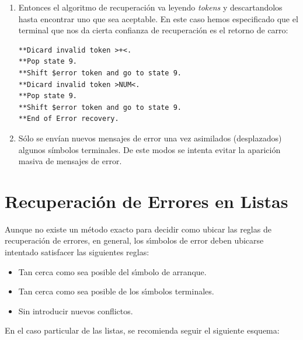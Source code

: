 \begin{enumerate}
En consecuencia, con lo dicho, en el ejemplo se va al estado 9:
\begin{verbatim}
	line -> error . '\n'	(Rule 5)
	'\n'	shift, and go to state 20
\end{verbatim}

\item
Entonces el algoritmo de recuperación va
leyendo \emph{tokens} y descartandolos hasta encontrar
uno que sea aceptable. En este caso hemos especificado
que el terminal que nos da cierta confianza de recuperación
es el retorno de carro:
\begin{verbatim}
**Dicard invalid token >+<.
**Pop state 9.
**Shift $error token and go to state 9.
**Dicard invalid token >NUM<.
**Pop state 9.
**Shift $error token and go to state 9.
**End of Error recovery.
\end{verbatim}

\item
Sólo se envían nuevos mensajes de error una vez asimilados (desplazados)
algunos símbolos terminales. De este modos se intenta evitar la aparición
masiva de mensajes de error.
\end{enumerate}

\section{Recuperación de Errores en Listas}
Aunque no existe un método exacto para decidir como ubicar
las reglas de recuperación de errores, 
en general, los s\'{\i}mbolos de error deben ubicarse intentado 
satisfacer las siguientes reglas:

\begin{itemize}
\item
Tan cerca como sea posible del s\'{\i}mbolo de arranque.
\item
Tan cerca como sea posible de los s\'{\i}mbolos terminales.
\item
Sin introducir nuevos conflictos.
\end{itemize}

En el caso particular de las listas, se recomienda seguir el
siguiente esquema:

